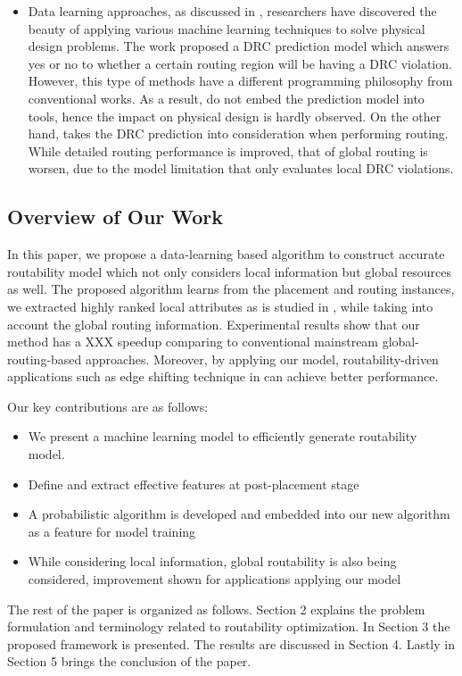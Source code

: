 \begin{itemize}
\item Data learning approaches, as discussed in \cite{mlinphysicaldesign}, researchers have discovered the beauty of applying various machine learning techniques to solve physical design problems. The work \cite{drcpredict18} proposed a DRC prediction model which answers yes or no to whether a certain routing region will be having a DRC violation. However, this type of methods have a different programming philosophy from conventional works. As a result, \cite{drcpredict18,drcDAT18} do not embed the prediction model into tools, hence the impact on physical design is hardly observed. On the other hand, \cite{drcingr} takes the DRC prediction into consideration when performing routing. While detailed routing performance is improved, that of global routing is worsen, due to the model limitation that only evaluates local DRC violations.
\end{itemize}


\subsection{Overview of Our Work}
In this paper, we propose a data-learning based algorithm to construct accurate routability model which not only considers local information but global resources as well. The proposed algorithm learns from the placement and routing instances, we extracted highly ranked local attributes as is studied in \cite{parameterstudy}, while taking into account the global routing information. Experimental results show that our method has a XXX speedup comparing to conventional mainstream global-routing-based approaches. Moreover, by applying our model, routability-driven applications such as edge shifting technique in \cite{fastroute} can achieve better performance. 

Our key contributions are as follows:
\begin{itemize}
\item We present a machine learning model to efficiently generate routability model.
\item Define and extract effective features at post-placement stage
\item A probabilistic algorithm is developed and embedded into our new algorithm as a feature for model training
\item While considering local information, global routability is also being considered, improvement shown for applications applying our model 
\end{itemize}

The rest of the paper is organized as follows. Section 2 explains the problem formulation and terminology related to routability optimization. In Section 3 the proposed framework is presented. The results are discussed in Section 4. Lastly in Section 5 brings the conclusion of the paper.
